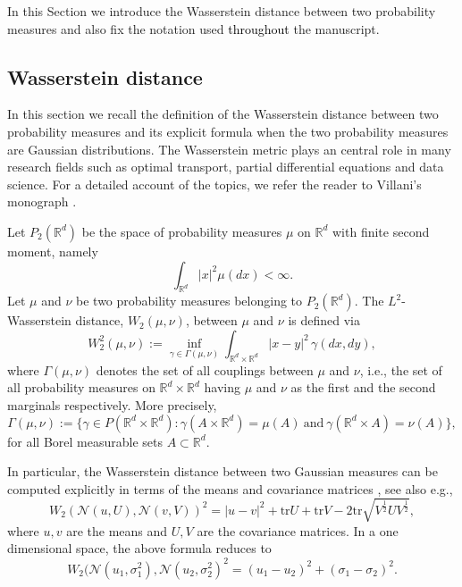 \documentclass[a4paper,twoside]{article}      %
\def\R{\mathbb{R}}
\theoremstyle{definition}
\def\N{\mathcal{N}}
\newcommand{\AM}{\textcolor{black}}
\begin{document}
In this Section we introduce the Wasserstein distance between two probability measures and also fix the notation used \AM{throughout} the manuscript.

\subsection{Wasserstein distance}
In this section we recall the definition of the Wasserstein distance between two probability measures and its explicit formula when the two probability measures are Gaussian distributions. The Wasserstein metric plays an central role in many research fields such as optimal transport, partial differential equations and data science. For a detailed account of the topics, we refer the reader to Villani's monograph \cite{Villani2003}.

Let $P_2(\R^d)$ be the space of probability measures $\mu$ on $\R^d$ with finite second moment, namely
$$
\int_{\R^d}|x|^2\mu(dx)<\infty.
$$
Let $\mu$ and $\nu$ be two probability measures belonging to $P_2(\R^d)$. The $L^2$-Wasserstein distance, $W_2(\mu,\nu)$, between $\mu$ and $\nu$ is defined via
\begin{equation}
\label{eq: W2}
W^2_2(\mu,\nu):=\inf_{\gamma\in \Gamma(\mu,\nu)}\int_{\R^d\times\R^d}|x-y|^2\,\gamma(dx,dy),
\end{equation}
where $\Gamma(\mu,\nu)$ denotes the set of all couplings between $\mu$ and $\nu$, i.e., the set of all probability measures on $\R^d\times \R^d$ having $\mu$ and $\nu$ as the first and the second marginals respectively. More precisely,
$$
\Gamma(\mu,\nu):=\{\gamma\in P(\R^d\times \R^d): \gamma(A\times \R^d)=\mu(A)~\text{and}~ \gamma(\R^d\times A)=\nu(A)\},
$$
for all Borel measurable sets $A\subset\R^d$. 



In particular, the Wasserstein distance between two Gaussian measures can be computed explicitly in terms of the means and covariance matrices  \cite{GivensShortt1984}, see also e.g., \cite{Takatsu2012}
\begin{equation}
\label{eq: W2-Gaussians}
W_2(\N(u,U),\N(v,V))^2=|u-v|^2+\mathrm{tr}U+\mathrm{tr}V-2\mathrm{tr}\sqrt{V^\frac{1}{2}U V^\frac{1}{2}},
\end{equation}
where $u, v$ are the means and $U, V$ are the covariance matrices.
In a one dimensional space, the above formula reduces to
\begin{equation}
W_2(\N(u_1,\sigma_1^2),\N(u_2,\sigma_2^2)^2=(u_1-u_2)^2+(\sigma_1-\sigma_2)^2.
\end{equation}
\end{document}
